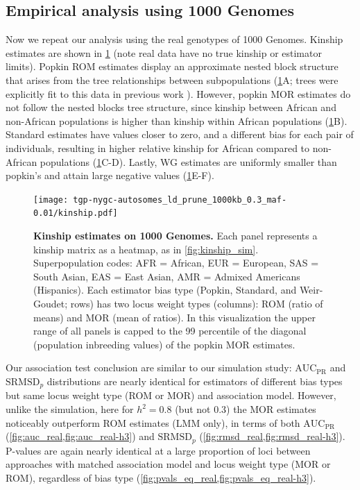 \documentclass[11pt]{article}
\newcommand{\rmsd}{\text{SRMSD}_p}
\newcommand{\auc}{\text{AUC}_\text{PR}}
\begin{document}
\begin{linenumbers}
\subsection{Empirical analysis using 1000 Genomes}

Now we repeat our analysis using the real genotypes of 1000 Genomes.
Kinship estimates are shown in \cref{fig:kinship_real} (note real data have no true kinship or estimator limits).
Popkin ROM estimates display an approximate nested block structure that arises from the tree relationships between subpopulations (\cref{fig:kinship_real}A; trees were explicitly fit to this data in previous work \citep{yao_limitations_2022}).
However, popkin MOR estimates do not follow the nested blocks tree structure, since kinship between African and non-African populations is higher than kinship within African populations (\cref{fig:kinship_real}B).
Standard estimates have values closer to zero, and a different bias for each pair of individuals, resulting in higher relative kinship for African compared to non-African populations (\cref{fig:kinship_real}C-D).
Lastly, WG estimates are uniformly smaller than popkin's and attain large negative values (\cref{fig:kinship_real}E-F).

\begin{figure}[bp!]
  \centering
  \texttt{[image: tgp-nygc-autosomes\_ld\_prune\_1000kb\_0.3\_maf-0.01/kinship.pdf]}
  \caption{
    {\bf Kinship estimates on 1000 Genomes.}
    Each panel represents a kinship matrix as a heatmap, as in \cref{fig:kinship_sim}.
    Superpopulation codes: AFR = African, EUR = European, SAS = South Asian, EAS = East Asian, AMR = Admixed Americans (Hispanics).
    Each estimator bias type (Popkin, Standard, and Weir-Goudet; rows) has two locus weight types (columns): ROM (ratio of means) and MOR (mean of ratios).
    In this visualization the upper range of all panels is capped to the 99 percentile of the diagonal (population inbreeding values) of the popkin MOR estimates.
  }
  \label{fig:kinship_real}
\end{figure}

Our association test conclusion are similar to our simulation study: $\auc$ and $\rmsd$ distributions are nearly identical for estimators of different bias types but same locus weight type (ROM or MOR) and association model.
However, unlike the simulation, here for $h^2=0.8$ (but not 0.3) the MOR estimates noticeably outperform ROM estimates (LMM only), in terms of both $\auc$ (\cref{fig:auc_real,fig:auc_real-h3}) and $\rmsd$ (\cref{fig:rmsd_real,fig:rmsd_real-h3}).
P-values are again nearly identical at a large proportion of loci between approaches with matched association model and locus weight type (MOR or ROM), regardless of bias type (\cref{fig:pvals_eq_real,fig:pvals_eq_real-h3}).


\end{linenumbers}
\end{document}
